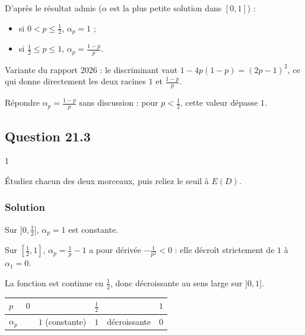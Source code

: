 \documentclass[11pt,a4paper]{article}
\providecommand{\tightlist}{\setlength{\itemsep}{0pt}\setlength{\parskip}{0pt}}
\newcommand{\equationajustee}[1]{%
  \sbox{\boiteequation}{$\displaystyle #1$}%
  \ifdim\wd\boiteequation>\linewidth
    \[\resizebox{\linewidth}{!}{\usebox{\boiteequation}}\]%
  \else
    \[#1\]%
  \fi}
\begin{document}
D'après le résultat admis (\(\alpha\) est la plus petite solution dans \([0,1]\)) :

\begin{itemize}
\tightlist
\item
  si \(0<p\le\frac12\), \(\alpha_p=1\) ;
\item
  si \(\frac12\le p\le1\), \(\alpha_p=\frac{1-p}p\).
\end{itemize}

\equationajustee{\boxed{\alpha_p=\min\Big(1,\ \frac{1-p}p\Big)}}

\begin{methode}

Variante du rapport 2026 : le discriminant vaut \(1-4p(1-p)=(2p-1)^2\), ce qui donne directement les deux racines \(1\) et \(\frac{1-p}p\).

\end{methode}

\begin{piege}

Répondre \(\alpha_p=\frac{1-p}p\) sans discussion : pour \(p<\frac12\), cette valeur dépasse \(1\).

\end{piege}

\hypertarget{question-21.3}{%
\subsection{Question 21.3}\label{question-21.3}}

\begin{indication}{1}

Étudiez chacun des deux morceaux, puis reliez le seuil à \(E(D)\).

\end{indication}

\hypertarget{solution-43}{%
\subsubsection{Solution}\label{solution-43}}

Sur \(]0,\frac12]\), \(\alpha_p=1\) est constante.

Sur \([\frac12,1]\), \(\alpha_p=\frac1p-1\) a pour dérivée \(-\frac1{p^2}<0\) : elle décroît strictement de \(1\) à \(\alpha_1=0\).

La fonction est continue en \(\frac12\), donc décroissante au sens large sur \(]0,1]\).

\begin{longtable}[]{@{}llllll@{}}
\toprule\noalign{}
\(p\) & \(0\) & & \(\frac12\) & & \(1\) \\
\midrule\noalign{}
\endhead
\bottomrule\noalign{}
\endlastfoot
\(\alpha_p\) & & \(1\) (constante) & \(1\) & décroissante & \(0\) \\
\end{longtable}
\end{document}
